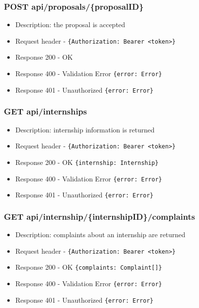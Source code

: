 \subsubsection{POST api/proposals/\{proposalID\}}
\begin{itemize}
    \item Description: the proposal is accepted
    \item Request header - \verb|{Authorization: Bearer <token>}|
    \item Response 200 - OK
    \item Response 400 - Validation Error \verb|{error: Error}|
    \item Response 401 - Unauthorized \verb|{error: Error}|
\end{itemize}

\subsubsection{GET api/internships}
\begin{itemize}
    \item Description: internship information is returned
    \item Request header - \verb|{Authorization: Bearer <token>}|
    \item Response 200 - OK \verb|{internship: Internship}|
    \item Response 400 - Validation Error \verb|{error: Error}|
    \item Response 401 - Unauthorized \verb|{error: Error}|
\end{itemize}

\subsubsection{GET api/internship/\{internshipID\}/complaints}
\begin{itemize}
    \item Description: complaints about an internship are returned
    \item Request header - \verb|{Authorization: Bearer <token>}|
    \item Response 200 - OK \verb|{complaints: Complaint[]}|
    \item Response 400 - Validation Error \verb|{error: Error}|
    \item Response 401 - Unauthorized \verb|{error: Error}|
\end{itemize}


